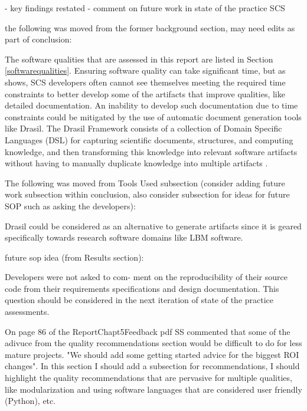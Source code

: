 \documentclass[12pt, notitlepage]{article}
\begin{document}
- key findings restated
- comment on future work in state of the practice SCS

the following was moved from the former background section, may need edits as part of conclusion:

  The software qualities that are assessed in this report are listed in Section \ref{softwarequalities}. Ensuring software quality can take significant time, but as \cite{SmithEtAl2016} shows, SCS developers often cannot see themselves meeting the required time constraints to better develop some of the artifacts that improve qualities, like detailed documentation. An inability to develop such documentation due to time constraints could be mitigated by the use of automatic document generation tools like Drasil. The Drasil Framework consists of a collection of Domain Specific Languages (DSL) for capturing scientific documents, structures, and computing
knowledge, and then transforming this knowledge into relevant software artifacts without having to manually duplicate knowledge into multiple artifacts \citep{zhao2018}.


The following was moved from Tools Used subsection (consider adding future work subsection within conclusion, also consider subsection for ideas for future SOP such as asking the developers):

Drasil could be considered as an alternative to generate artifacts since it is geared specifically towards research software domains like LBM software. 

future sop idea (from Results section):

Developers were not asked to com-
ment on the reproducibility of their source code from their requirements specifications and
design documentation. This question should be considered in the next iteration of state of
the practice assessments.


On page 86 of the ReportChapt5Feedback pdf SS commented that some of the adivuce from the quality recommendations section would be difficult to do for less mature projects. "We should add some getting started advice for the biggest ROI changes". 
In this section I should add a subsection for recommendations, I should highlight the quality recommendations that are pervasive for multiple qualities, like modularization and using software languages that are considered user friendly (Python), etc.

\newpage
\end{document}
